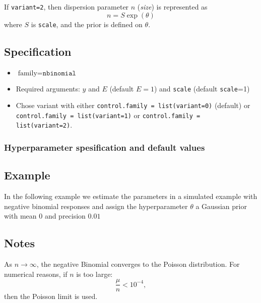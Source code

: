 \documentclass[a4paper,11pt]{article}
\begin{document}
If \verb|variant=2|, then dispersion parameter $n$ (\emph{size}) is
represented as
\begin{displaymath}
    n = S\exp(\theta)
\end{displaymath}
where $S$ is \texttt{scale}, and the prior is defined on $\theta$.

\subsection*{Specification}

\begin{itemize}
\item $\text{family}=\texttt{nbinomial}$
\item Required arguments: $y$ and $E$ (default $E=1$) and
    \texttt{scale} (default \texttt{scale}=1)
\item Chose variant with either
    \verb|control.family = list(variant=0)| (default) or\\
    \verb|control.family = list(variant=1)| or \verb|control.family = list(variant=2)|.
    
\end{itemize}

\subsubsection*{Hyperparameter spesification and default values}



\subsection*{Example}

In the following example we estimate the parameters in a simulated
example with negative binomial responses and assign the hyperparameter
$\theta$ a Gaussian prior with mean $0$ and precision $0.01$


\subsection*{Notes}

As $n\rightarrow\infty$, the negative Binomial converges to the
Poisson distribution. For numerical reasons, if $n$ is too large:
\begin{displaymath}
    \frac{\mu}{n} < 10^{-4},
\end{displaymath}
then the Poisson limit is used.
\end{document}
